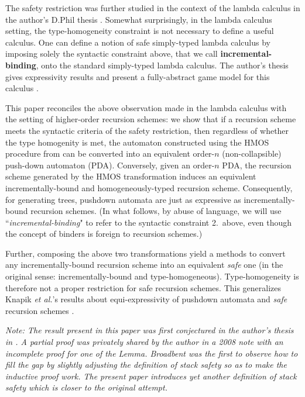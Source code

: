 \documentclass[a4paper,draft]{article}[12pt]
\theoremstyle{remark}
\theoremstyle{definition}
\begin{document}
The safety restriction was further studied in the context of the lambda calculus
in the author's D.Phil thesis \cite{BlumPhd}. Somewhat surprisingly, in the
lambda calculus setting, the type-homogeneity constraint is not necessary to
define a useful calculus. One can define a notion of safe simply-typed lambda
calculus by imposing solely the syntactic constraint above, that we call
\textbf{incremental-binding}, onto the standard simply-typed lambda calculus.
The author's thesis gives expressivity results and present a fully-abstract game
model for this calculus \cite{BlumPhd}. 

This paper reconciles the above observation made in the lambda calculus with the setting of higher-order recursion schemes: we show that if a recursion scheme meets the syntactic criteria of the safety restriction, then regardless of whether the type homogenity is met, the automaton constructed using the HMOS procedure from \cite{hmos-lics08} can be converted into an equivalent order-$n$ (non-collapsible) push-down automaton (PDA). Conversely, given an order-$n$ PDA, the recursion scheme generated by the HMOS transformation induces an equivalent incrementally-bound and homogeneously-typed recursion scheme. 
Consequently, for generating trees, pushdown automata are just as expressive as incrementally-bound recursion schemes.
(In what follows, by abuse of language, we will use ``\emph{incremental-binding}" to refer to the syntactic constraint 2.\ above, even though the concept of binders is foreign to recursion schemes.)

Further, composing the above two transformations yield a methods to 
convert any incrementally-bound recursion scheme into an equivalent \emph{safe} one (in the original sense: incrementally-bound and type-homogeneous). Type-homogeneity is therefore not a proper restriction for safe recursion schemes. This generalizes Knapik \emph{et al.}'s results about  equi-expressivity of pushdown automata and \emph{safe} recursion schemes \cite{KNU02}.
\vspace{1em}

\emph{Note: The result present in this paper was first conjectured in the author's thesis in \cite{BlumPhd}. A partial proof was privately shared by the author in a 2008 note with an incomplete proof for one of the Lemma. Broadbent \cite{Broadbent2009} was the first to observe how to fill the gap by slightly adjusting the definition of stack safety so as to make the inductive proof work. The present paper introduces yet another definition of stack safety which is closer to the original attempt.}
\end{document}
